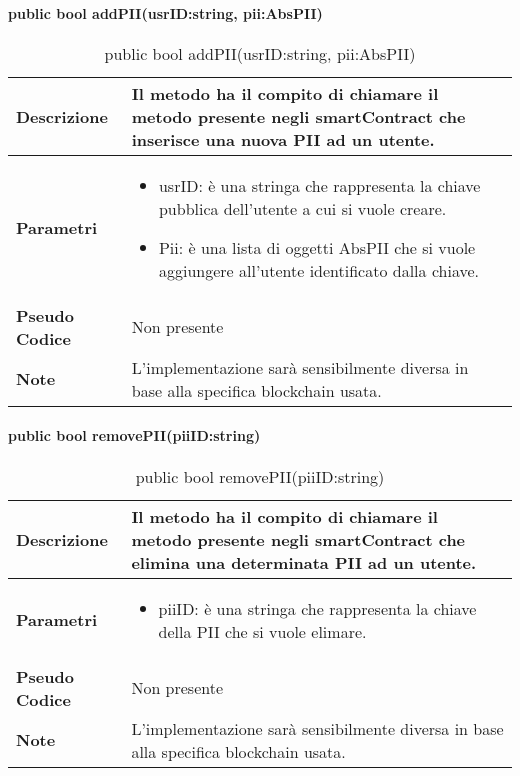 \paragraph{public bool addPII(usrID:string, pii:AbsPII)}
\begin{center}
    \begin{longtable}{|p{3cm}|p{9cm}|}%
    \caption{public bool addPII(usrID:string, pii:AbsPII)}
    \label{tab:public-bool-addPII}
    \endfirsthead
    \endhead
    \hline
    \textbf{Descrizione} & Il metodo ha il compito di chiamare il metodo presente negli smartContract che inserisce una nuova PII ad un utente.\\
    \hline
    \textbf{Parametri} &      
    \begin{itemize}
        \item usrID: è una stringa che rappresenta la chiave pubblica dell’utente a cui si vuole creare.
        \item Pii: è una lista di oggetti AbsPII che si vuole aggiungere all’utente identificato dalla chiave.
    \end{itemize} 
    \\
    \hline
    \textbf{Pseudo Codice} & 
    Non presente\\
    \hline
    \textbf{Note} & L’implementazione sarà sensibilmente diversa in base alla specifica blockchain usata. \\
    \hline
    \end{longtable}
    \end{center}


\paragraph{public bool removePII(piiID:string)}
\begin{center}
    \begin{longtable}{|p{3cm}|p{9cm}|}%
    \caption{public bool removePII(piiID:string)}
    \label{tab:public-bool-removePII}
    \endfirsthead
    \endhead
    \hline
    \textbf{Descrizione} & Il metodo ha il compito di chiamare il metodo presente negli smartContract che elimina una determinata PII ad un utente.\\
    \hline
    \textbf{Parametri} &      
    \begin{itemize}
        \item piiID: è una stringa che rappresenta la chiave della PII che si vuole elimare.
    \end{itemize} 
    \\
    \hline
    \textbf{Pseudo Codice} & 
    Non presente\\
    \hline
    \textbf{Note} & L’implementazione sarà sensibilmente diversa in base alla specifica blockchain usata. \\
    \hline
    \end{longtable}
    \end{center}

